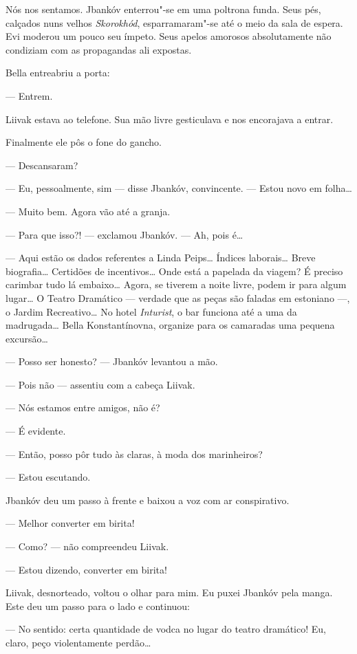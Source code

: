 Nós nos sentamos. Jbankóv enterrou"-se em uma poltrona funda. Seus pés,
calçados nuns velhos \emph{Skorokhód}, esparramaram"-se até o meio da
sala de espera. Evi moderou um pouco seu ímpeto. Seus apelos amorosos
absolutamente não condiziam com as propagandas ali expostas.

Bella entreabriu a porta:

--- Entrem.

Liivak estava ao telefone. Sua mão livre gesticulava e nos encorajava a
entrar.

Finalmente ele pôs o fone do gancho.

--- Descansaram?

--- Eu, pessoalmente, sim --- disse Jbankóv, convincente.
--- Estou novo em folha\ldots{}

--- Muito bem. Agora vão até a granja.

--- Para que isso?! --- exclamou Jbankóv. --- Ah,
pois é\ldots{}

--- Aqui estão os dados referentes a Linda Peips\ldots{} Índices
laborais\ldots{} Breve biografia\ldots{} Certidões de incentivos\ldots{} Onde está a
papelada da viagem? É preciso carimbar tudo lá embaixo\ldots{} Agora, se
tiverem a noite livre, podem ir para algum lugar\ldots{} O Teatro Dramático
--- verdade que as peças são faladas em estoniano ---, o
Jardim Recreativo\ldots{} No hotel \emph{Inturist}, o bar funciona até a uma
da madrugada\ldots{} Bella Konstantínovna, organize para os camaradas uma
pequena excursão\ldots{}

--- Posso ser honesto? --- Jbankóv levantou a mão.

--- Pois não --- assentiu com a cabeça Liivak.

--- Nós estamos entre amigos, não é?

--- É evidente.

--- Então, posso pôr tudo às claras, à moda dos marinheiros?

--- Estou escutando.

Jbankóv deu um passo à frente e baixou a voz com ar conspirativo.

--- Melhor converter em birita!

--- Como? --- não compreendeu Liivak.

--- Estou dizendo, converter em birita!

Liivak, desnorteado, voltou o olhar para mim. Eu puxei Jbankóv pela
manga. Este deu um passo para o lado e continuou:

--- No sentido: certa quantidade de vodca no lugar do teatro
dramático! Eu, claro, peço violentamente perdão\ldots{}

